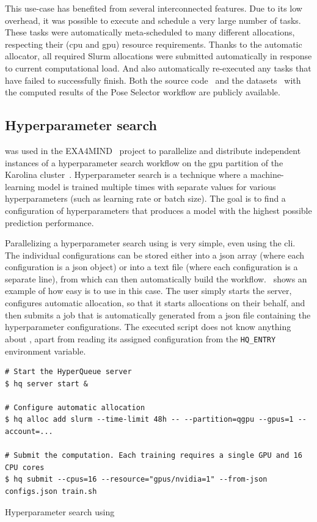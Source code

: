 This use-case has benefited from several interconnected \hyperqueue{} features. Due to
its low overhead, it was possible to execute and schedule a very large number of tasks. These tasks
were automatically meta-scheduled to many different allocations, respecting their
(\gls{cpu} and \gls{gpu}) resource requirements. Thanks to the
automatic allocator, all required Slurm allocations were submitted automatically in response to
current computational load. And \hyperqueue{} also automatically re-executed any tasks
that have failed to successfully finish. Both the source code~\cite{ps-workflow} and the
datasets~\cite{ps_dataset_1,ps_dataset_2} with the computed results of the Pose Selector workflow are
publicly available.

\subsection{Hyperparameter search}
\hyperqueue{} was used in the EXA4MIND~\cite{exa4mind} project to parallelize and
distribute independent instances of a hyperparameter search workflow on the \gls{gpu}
partition of the Karolina cluster~\cite{karolina}. Hyperparameter search is a technique
where a machine-learning model is trained multiple times with separate values for various
hyperparameters (such as learning rate or batch size). The goal is to find a configuration of
hyperparameters that produces a model with the highest possible prediction performance.

Parallelizing a hyperparameter search using \hyperqueue{} is very simple, even using the
\gls{cli}. The individual configurations can be stored either into a
\gls{json} array (where each configuration is a \gls{json} object) or
into a text file (where each configuration is a separate line), from which \hq{}
can then automatically build the workflow.~ shows an example of how easy is
to use \hq{} in this case. The user simply starts the server, configures
automatic allocation, so that it starts allocations on their behalf, and then submits a job that is
automatically generated from a \gls{json} file containing the hyperparameter configurations. The
executed script does not know anything about \hyperqueue{}, apart from reading its
assigned configuration from the \texttt{HQ\_ENTRY} environment variable.

\begin{listing}[h]
	\begin{verbatim}
# Start the HyperQueue server
$ hq server start &

# Configure automatic allocation
$ hq alloc add slurm --time-limit 48h -- --partition=qgpu --gpus=1 --account=...

# Submit the computation. Each training requires a single GPU and 16 CPU cores
$ hq submit --cpus=16 --resource="gpus/nvidia=1" --from-json configs.json train.sh
	\end{verbatim}
	\caption{Hyperparameter search using \hyperqueue{}}
	\label{lst:hq-exa4mind-hyperparameter-search}
\end{listing}

